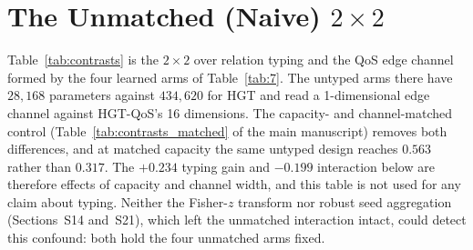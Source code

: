 \documentclass[preprint,3p]{elsarticle}
\begin{document}
\section{The Unmatched (Naive) \texorpdfstring{$2\times2$}{2x2}}
\label{supp:naive-2x2}

Table~\ref{tab:contrasts} is the $2\times2$ over relation typing and the QoS edge channel formed by the four learned arms of Table~\ref{tab:7}. The untyped arms there have $28{,}168$ parameters against $434{,}620$ for HGT and read a 1-dimensional edge channel against HGT-QoS's 16 dimensions. The capacity- and channel-matched control (Table~\ref{tab:contrasts_matched} of the main manuscript) removes both differences, and at matched capacity the same untyped design reaches $0.563$ rather than $0.317$. The $+0.234$ typing gain and $-0.199$ interaction below are therefore effects of capacity and channel width, and this table is not used for any claim about typing. Neither the Fisher-$z$ transform nor robust seed aggregation (Sections~S14 and~S21), which left the unmatched interaction intact, could detect this confound: both hold the four unmatched arms fixed.
\end{document}
